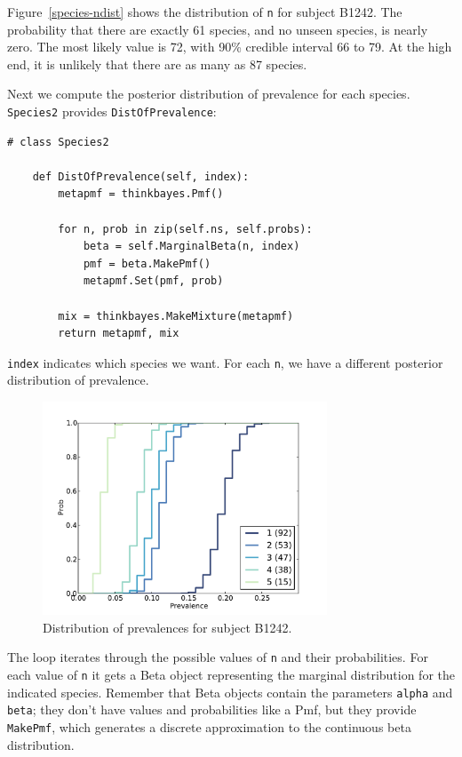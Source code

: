\documentclass[12pt]{book}
\begin{document}
Figure~\ref{species-ndist} shows the distribution of {\tt n} for
subject B1242.  The probability that there are exactly 61 species, and
no unseen species, is nearly zero.  The most likely value is 72, with
90\% credible interval 66 to 79.  At the high end, it is unlikely that
there are as many as 87 species.

Next we compute the posterior distribution of prevalence for
each species.  {\tt Species2} provides {\tt DistOfPrevalence}:

\begin{verbatim}
# class Species2

    def DistOfPrevalence(self, index):
        metapmf = thinkbayes.Pmf()

        for n, prob in zip(self.ns, self.probs):
            beta = self.MarginalBeta(n, index)
            pmf = beta.MakePmf()
            metapmf.Set(pmf, prob)

        mix = thinkbayes.MakeMixture(metapmf)
        return metapmf, mix
\end{verbatim}

{\tt index} indicates which species we want.  For each
{\tt n}, we have a different posterior distribution
of prevalence.

\begin{figure}
\centerline{\includegraphics[height=2.5in]{figs/species-prev-B1242.pdf}}
\caption{Distribution of prevalences for subject B1242.}
\label{species-prev}
\end{figure}

The loop iterates through the possible values of {\tt n}
and their probabilities.  For each value of {\tt n} it gets
a Beta object representing the marginal distribution for the
indicated species.  Remember that Beta objects contain the
parameters {\tt alpha} and {\tt beta}; they don't have
values and probabilities like a Pmf, but they provide {\tt MakePmf},
which generates a discrete approximation to the continuous
beta distribution.
\end{document}
